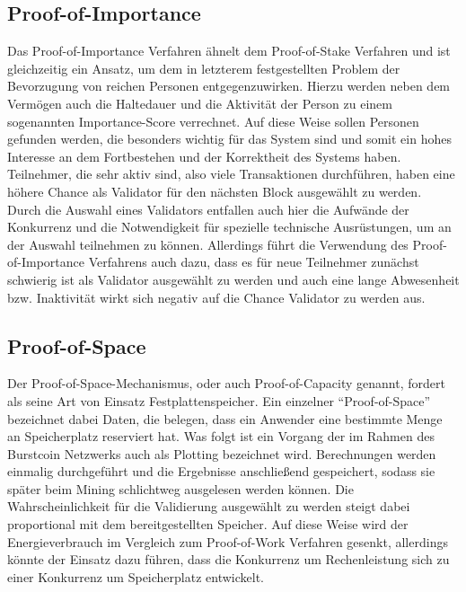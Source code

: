 \documentclass[12pt]{article}
\begin{document}
\subsection{Proof-of-Importance}
Das Proof-of-Importance Verfahren ähnelt dem Proof-of-Stake Verfahren und ist gleichzeitig ein Ansatz, um dem in letzterem festgestellten Problem der Bevorzugung von reichen Personen entgegenzuwirken. Hierzu werden neben dem Vermögen auch die Haltedauer und die Aktivität der Person zu einem sogenannten Importance-Score verrechnet. Auf diese Weise sollen Personen gefunden werden, die besonders wichtig für das System sind und somit ein hohes Interesse an dem Fortbestehen und der Korrektheit des Systems haben. Teilnehmer, die sehr aktiv sind, also viele Transaktionen durchführen, haben eine höhere Chance als Validator für den nächsten Block ausgewählt zu werden.\\
Durch die Auswahl eines Validators entfallen auch hier die Aufwände der Konkurrenz und die Notwendigkeit für spezielle technische Ausrüstungen, um an der Auswahl teilnehmen zu können. Allerdings führt die Verwendung des Proof-of-Importance Verfahrens auch dazu, dass es für neue Teilnehmer zunächst schwierig ist als Validator ausgewählt zu werden und auch eine lange Abwesenheit bzw. Inaktivität wirkt sich negativ auf die Chance Validator zu werden aus.

\subsection{Proof-of-Space}
Der Proof-of-Space-Mechanismus, oder auch Proof-of-Capacity genannt, fordert als seine Art von Einsatz Festplattenspeicher. Ein einzelner “Proof-of-Space” bezeichnet dabei Daten, die belegen, dass ein Anwender eine bestimmte Menge an Speicherplatz reserviert hat. Was folgt ist ein Vorgang der im Rahmen des Burstcoin Netzwerks auch als Plotting bezeichnet wird. Berechnungen werden einmalig durchgeführt und die Ergebnisse anschließend gespeichert, sodass sie später beim Mining schlichtweg ausgelesen werden können. Die Wahrscheinlichkeit für die Validierung ausgewählt zu werden steigt dabei proportional mit dem bereitgestellten Speicher. Auf diese Weise wird der Energieverbrauch im Vergleich zum Proof-of-Work Verfahren gesenkt, allerdings könnte der Einsatz dazu führen, dass die Konkurrenz um Rechenleistung sich zu einer Konkurrenz um Speicherplatz entwickelt.
\end{document}

